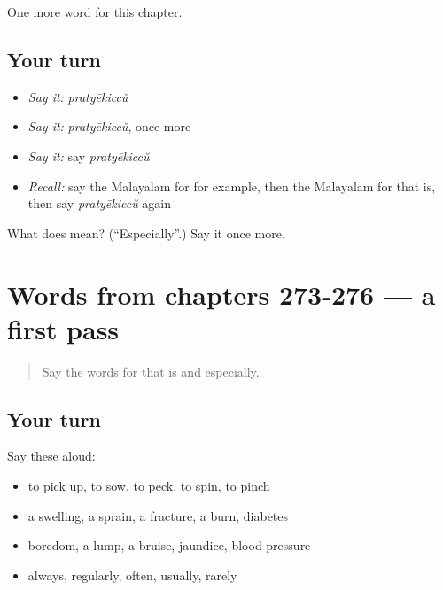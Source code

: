 \begin{grammarlens}[title={What you've built}]
One more word for this chapter.
\end{grammarlens}

\subsection*{Your turn}
\begin{itemize}
\raggedright
  \item \emph{Say it:} \emph{pratyēkiccŭ}
  \item \emph{Say it:} \emph{pratyēkiccŭ}, once more
  \item \emph{Say it:} say \emph{pratyēkiccŭ}
  \item \emph{Recall:} say the Malayalam for for example, then the Malayalam for that is, then say \emph{pratyēkiccŭ} again
\end{itemize}

\begin{tcolorbox}[breakable,colback=teal!4,colframe=teal!35!black,title={Before you move on}]
What does  mean? (\textquotedblleft{}Especially\textquotedblright{}.) Say it once more.
\end{tcolorbox}
\section[(dialogue)]{Words from chapters 273-276 — a first pass}

\label{lesson:ML-R281-first-pass-words-from-chapters-273-276}



\begin{quote}
Say the words for that is and especially.
\end{quote}

\subsection*{Your turn}
Say these aloud:

\begin{itemize}
\raggedright
  \item to pick up, to sow, to peck, to spin, to pinch
  \item a swelling, a sprain, a fracture, a burn, diabetes
  \item boredom, a lump, a bruise, jaundice, blood pressure
  \item always, regularly, often, usually, rarely
\end{itemize}

